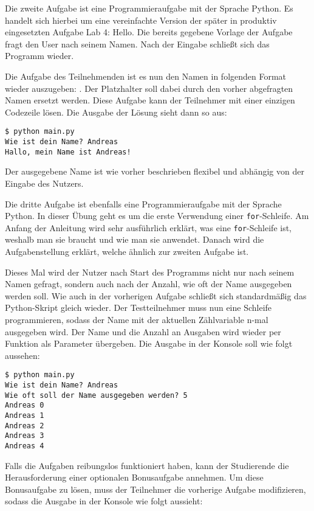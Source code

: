 Die zweite Aufgabe ist eine Programmieraufgabe mit der Sprache Python. Es
handelt sich hierbei um eine vereinfachte Version der später in produktiv
eingesetzten Aufgabe \glqq Lab 4: Hello\grqq{}. Die bereits gegebene Vorlage der
Aufgabe fragt den User nach seinem Namen. Nach der Eingabe schließt sich das
Programm wieder. \parencite{git-repo:first-loop}

Die Aufgabe des Teilnehmenden ist es nun den Namen in folgenden
Format wieder auszugeben: . Der Platzhalter
 soll dabei durch den vorher abgefragten Namen ersetzt werden.
Diese Aufgabe kann der Teilnehmer mit einer einzigen Codezeile lösen. Die
Ausgabe der Lösung sieht dann so aus:

\begin{lstlisting}[style=Bash]
$ python main.py
Wie ist dein Name? Andreas
Hallo, mein Name ist Andreas!
\end{lstlisting}

Der ausgegebene Name ist wie vorher beschrieben flexibel und abhängig von der
Eingabe des Nutzers.

Die dritte Aufgabe ist ebenfalls eine Programmieraufgabe mit der Sprache Python.
In dieser Übung geht es um die erste Verwendung einer \texttt{for}-Schleife.
Am Anfang der Anleitung wird sehr ausführlich erklärt, was eine
\texttt{for}-Schleife ist, weshalb man sie braucht und wie man sie anwendet.
Danach wird die Aufgabenstellung erklärt, welche ähnlich zur zweiten Aufgabe
ist. \parencite{git-repo:first-loop}

Dieses Mal wird der Nutzer nach Start des Programms nicht nur nach seinem
Namen gefragt, sondern auch nach der Anzahl, wie oft der Name ausgegeben werden
soll. Wie auch in der vorherigen Aufgabe schließt sich standardmäßig das
Python-Skript gleich wieder. Der Testteilnehmer muss nun eine Schleife
programmieren, sodass der Name mit der aktuellen Zählvariable n-mal ausgegeben
wird. Der Name und die Anzahl an Ausgaben wird wieder per Funktion als Parameter
übergeben. Die Ausgabe in der Konsole soll wie folgt aussehen:

\begin{lstlisting}[style=Bash]
$ python main.py
Wie ist dein Name? Andreas
Wie oft soll der Name ausgegeben werden? 5
Andreas 0
Andreas 1
Andreas 2
Andreas 3
Andreas 4
\end{lstlisting}

\newpage

Falls die Aufgaben reibungslos funktioniert haben, kann der Studierende
die Herausforderung einer optionalen Bonusaufgabe annehmen. Um diese
Bonusaufgabe zu lösen, muss der Teilnehmer die vorherige Aufgabe modifizieren,
sodass die Ausgabe in der Konsole wie folgt aussieht:

